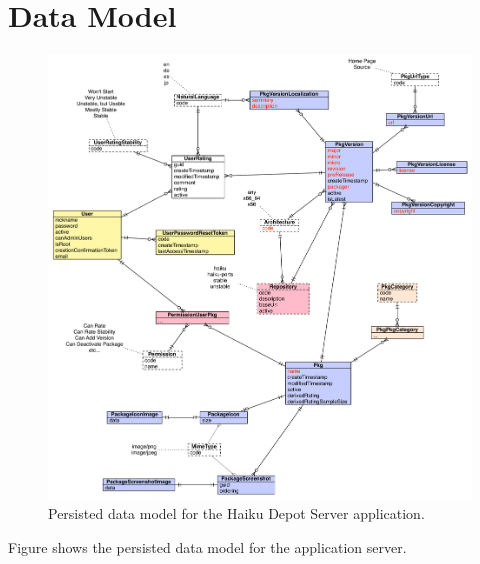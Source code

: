 
\section{Data Model}

\begin{figure}
\centering
\vspace{.2in}
\includegraphics[width=6.5in]{img-datamodel.pdf}
\caption{Persisted data model for the Haiku Depot Server application.}
\label{\thefigure}
\end{figure}

Figure {\thefigure} shows the persisted data model for the application server.